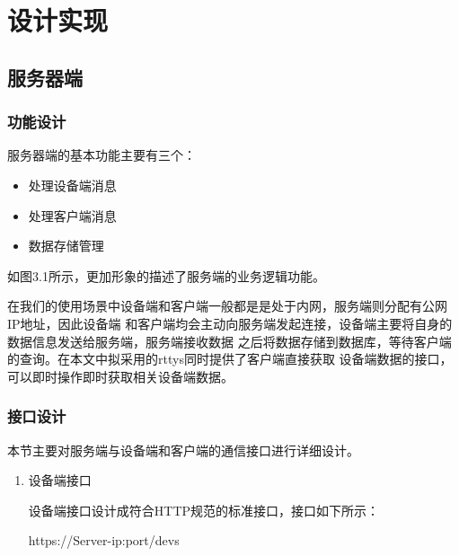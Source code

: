 \documentclass[a4paper,12pt]{report}
\begin{document}
\chapter{设计实现}
\begin{spacing}{1.5}
\songti{}

\section{服务器端}
\subsection{功能设计}
服务器端的基本功能主要有三个：

\begin{itemize}
    \itemsep=3pt
    \parskip=0pt
    \setlength{\itemindent}{1em}
    \item 处理设备端消息
    \item 处理客户端消息
    \item 数据存储管理
\end{itemize}

如图3.1所示，更加形象的描述了服务端的业务逻辑功能。

在我们的使用场景中设备端和客户端一般都是是处于内网，服务端则分配有公网IP地址，因此设备端
和客户端均会主动向服务端发起连接，设备端主要将自身的数据信息发送给服务端，服务端接收数据
之后将数据存储到数据库，等待客户端的查询。在本文中拟采用的rttys同时提供了客户端直接获取
设备端数据的接口，可以即时操作即时获取相关设备端数据。


\subsection{接口设计}
本节主要对服务端与设备端和客户端的通信接口进行详细设计。
\begin{enumerate}[(1)]
    \itemsep=3pt
    \parskip=0pt
    \setlength{\itemindent}{2em}
    \item 设备端接口

        设备端接口设计成符合HTTP规范的标准接口，接口如下所示：
        \begin{tcolorbox}[notitle,boxrule=0pt,colback=blue!20,colframe=blue!20]
            https://Server-ip:port/devs
        \end{tcolorbox}


\end{enumerate}
\end{spacing}
\end{document}
